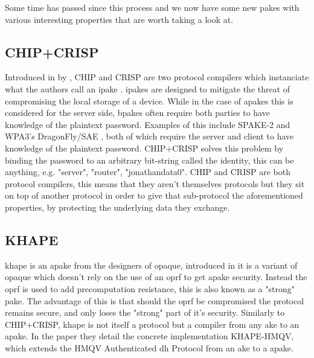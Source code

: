 Some time has passed since this process and we now have some new \glspl{pake} with various interesting properties that are worth taking a look at.

\subsection{CHIP+CRISP}
Introduced in \citeyear{chip+crisp} by \citeauthor{chip+crisp}, CHIP and CRISP are two protocol compilers which instanciate what the authors call an \gls{ipake} \cite{chip+crisp}.
\glspl{ipake} are designed to mitigate the threat of compromising the local storage of a device.
While in the case of \glspl{apake} this is considered for the server side, \glspl{bpake} often require both parties to have knowledge of the plaintext password.
Examples of this include SPAKE-2 \cite{spake} and WPA3's DragonFly/SAE \cite{sae}, both of which require the server and client to have knowledge of the plaintext password.
CHIP+CRISP solves this problem by binding the password to an arbitrary bit-string called the identity, this can be anything, e.g. "server", "router", "jonathandata0".
CHIP and CRISP are both protocol compilers, this means that they aren't themselves protocols but they sit on top of another protocol in order to give that sub-protocol the aforementioned properties, by protecting the underlying data they exchange.

\subsection{KHAPE}
\gls{khape} \cite{khape} is an \gls{apake} from the designers of \gls{opaque}, introduced in \citeyear{khape} it is a variant of \gls{opaque} which doesn't rely on the use of an \gls{oprf} to get \gls{apake} security.
Instead the \gls{oprf} is used to add precomputation resistance, this is also known as a "strong" \gls{pake}.
The advantage of this is that should the \gls{oprf} be compromised the protocol remains secure, and only loses the "strong" part of it's security.
Similarly to CHIP+CRISP, \gls{khape} is not itself a protocol but a compiler from any \gls{ake} to an \gls{apake}.
In the paper they detail the concrete implementation KHAPE-HMQV, which extends the HMQV Authenticated \gls{dh} Protocol from an \gls{ake} to a \gls{apake}.

